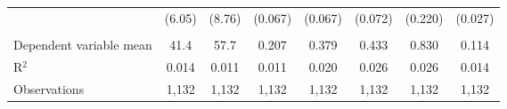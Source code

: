 \begin{adjustbox}{width = \textwidth, center}
\begin{tabular}{lccccccc}
                              & (6.05)        & (8.76)            & (0.067)       & (0.067)           & (0.072)       & (0.220)        & (0.027)\\   
       \\
      Dependent variable mean & 41.4          & 57.7              & 0.207         & 0.379             & 0.433         & 0.830          & 0.114\\  
      R$^2$                   & 0.014         & 0.011             & 0.011         & 0.020             & 0.026         & 0.026          & 0.014\\  
      Observations            & 1,132         & 1,132             & 1,132         & 1,132             & 1,132         & 1,132          & 1,132\\  
      \bottomrule
   \end{tabular}
\end{adjustbox}
\par\endgroup



